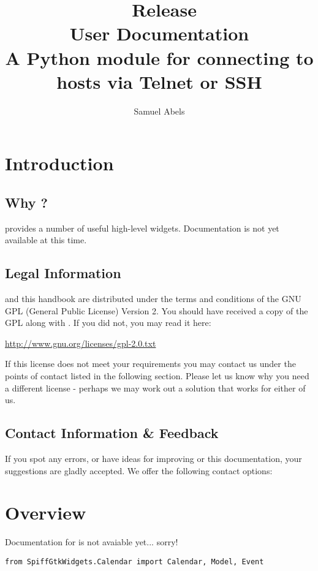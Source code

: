 \title{\productname\ Release \productversion\\
User Documentation\\
\vspace{5 mm}
\large A Python module for connecting to hosts via Telnet or SSH}
\author{Samuel Abels}


\maketitle
\tableofcontents

\newpage
\section{Introduction}
\subsection{Why \productname?}

\product provides a number of useful high-level widgets.
Documentation is not yet available at this time.


\subsection{Legal Information}

\product and this handbook are distributed under the terms and conditions 
of the GNU GPL (General Public License) Version 2. You should have received 
a copy of the GPL along with \product. If you did not, you may read it here:

\vspace{1em}
\url{http://www.gnu.org/licenses/gpl-2.0.txt}
\vspace{1em}

If this license does not meet your requirements you may contact us under 
the points of contact listed in the following section. Please let us know 
why you need a different license - perhaps we may work out a solution 
that works for either of us.


\subsection{Contact Information \& Feedback}

If you spot any errors, or have ideas for improving \product or this 
documentation, your suggestions are gladly accepted.
We offer the following contact options: \\



\newpage
\section{Overview}

Documentation for \product is not avaiable yet... sorry!

\begin{lstlisting}
from SpiffGtkWidgets.Calendar import Calendar, Model, Event
\end{lstlisting}


